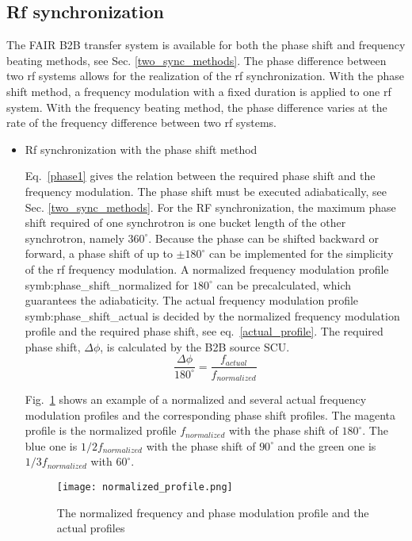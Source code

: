 \subsection{Rf synchronization}
The FAIR B2B transfer system is available for both the phase shift and frequency beating methods, see Sec. \ref{two_sync_methods}. The phase difference between two rf systems allows for the realization of the rf synchronization. With the phase shift method, a frequency modulation with a fixed duration is applied to one rf system. With the frequency beating method, the phase difference varies at the rate of the frequency difference between two rf systems.
\begin{itemize}
\item Rf synchronization with the phase shift method

 
Eq.~\ref{phase1} gives the relation between the required phase shift and the frequency modulation. The phase shift must be executed adiabatically, see Sec. \ref{two_sync_methods}. For the RF synchronization, the maximum phase shift required of one synchrotron is one bucket length of the other synchrotron, namely $360^\circ$. Because the phase can be shifted backward or forward, a phase shift of up to $\pm 180^\circ$ can be implemented for the simplicity of the rf frequency modulation. A normalized frequency modulation profile \gls{symb:phase_shift_normalized} for $180^\circ$ can be precalculated, which guarantees the adiabaticity. The actual frequency modulation profile \gls{symb:phase_shift_actual} is decided by the normalized frequency modulation profile and the required phase shift, see eq.~\ref{actual_profile}. The required phase shift, $\Delta \phi$, is calculated by the B2B source SCU.
\begin{equation}
\frac{\Delta \phi}{180^\circ}= \frac{f_{\mathit{actual}}}{f_{\mathit{normalized}}} \label{actual_profile}
\end{equation}

Fig.~\ref{normalized_profile} shows an example of a normalized and several actual frequency  modulation profiles and the corresponding phase shift profiles. The magenta profile is the normalized profile $f_{normalized}$ with the phase shift of $180^\circ$. The blue one is $1/2 f_{\mathit{normalized}}$ with the phase shift of $90^\circ$ and the green one is $1/3 f_{\mathit{normalized}}$ with $60^\circ$. 
\begin{figure}[H]
   \centering   
   \texttt{[image: normalized\_profile.png]}
   \caption{The normalized frequency and phase modulation profile and the actual profiles}
   \label{normalized_profile}
\end{figure}  


\end{itemize}
